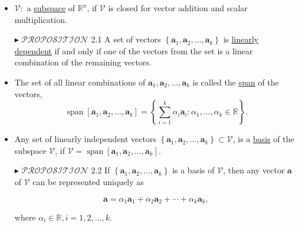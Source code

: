 \documentclass[12pt,thmsa]{article}
\begin{document}
\begin{itemize}
	\item \(\mathcal{V}:\) a \underline{subspace} of \(\mathbb{R}^{n}\), if \(\mathcal{V}\) is closed for vector addition and scalar multiplication.
\end{itemize}


\begin{itemize}
	\item[\(\blacktriangleright\)] \(\mathscr{PROPOSITION}\) 2.1 A set of vectors \(\left\{\boldsymbol{a}_{1}, \boldsymbol{a}_{2}, \ldots, \boldsymbol{a}_{k}\right\}\) is \underline{linearly dependent} if and only if one of the vectors from the set is a linear combination of the remaining vectors.
\end{itemize}

\begin{itemize}
	\item The set of {\color{blue}all} linear combinations of \( \boldsymbol{a}_{1}, \boldsymbol{a}_{2}, \ldots, \boldsymbol{a}_{k} \) is called the \underline{span} of the vectors,
	\[ \operatorname{span}\left[\boldsymbol{a}_{1}, \boldsymbol{a}_{2}, \ldots, \boldsymbol{a}_{k}\right]=\left\{\sum_{i=1}^{k} \alpha_{i} \boldsymbol{a}_{i}: \alpha_{1}, \ldots, \alpha_{k} \in \mathbb{R}\right\}. \]
	
	\item Any set of linearly independent vectors \(\left\{\boldsymbol{a}_{1}, \boldsymbol{a}_{2}, \ldots, \boldsymbol{a}_{k}\right\} \subset \mathcal{V}\), is a \underline{basis} of the subspace \(\mathcal{V}\), if \(\mathcal{V}=\operatorname{span}\left[\boldsymbol{a}_{1}, \boldsymbol{a}_{2}, \ldots, \boldsymbol{a}_{k}\right]\).
	
	\item[\(\blacktriangleright\)] \(\mathscr{PROPOSITION}\) 2.2 If \(\left\{\boldsymbol{a}_{1}, \boldsymbol{a}_{2}, \ldots, \boldsymbol{a}_{k}\right\}\) is a basis of \(\mathcal{V}\), then any vector \(\boldsymbol{a}\) of \(\mathcal{V}\) can be represented uniquely as
	
	\begin{equation*}
		\boldsymbol{a}=\alpha_{1} \boldsymbol{a}_{1}+\alpha_{2} \boldsymbol{a}_{2}+\cdots+\alpha_{k} \boldsymbol{a}_{k},
	\end{equation*}
	
	where \(\alpha_{i} \in \mathbb{R}, i=1,2, \ldots, k\).
\end{itemize}

\end{document}
